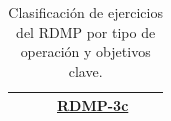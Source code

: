 \begin{table}[H]
{\begin{tabular}{|p{4.5cm}|p{2.5cm}|p{2cm}|p{2.5cm}|p{2.5cm}|p{3.5cm}|}
                                                                                                                                                                                                            &
                                                                                                                                                                                                            &
                                                                                                                                                                                                            &
            \hyperlink{qs:RDMP-3c}{RDMP-3c}                                                                                                                                                                                                                                                                                                                       \\
            \hline
        \end{tabular}
    }
    \caption{Clasificación de ejercicios del RDMP por tipo de operación y objetivos clave.}
    \label{tab:clasificacion_rdmp}
\end{table}
\vspace{1em}

